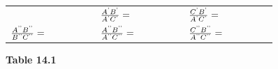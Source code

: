 {\begin{center}
\begin{xtabular*}{\mytablewidth}[t]{|p{10\mystarwidth}|p{10\mystarwidth}|p{10\mystarwidth}|}
               &
                \begin{math}\frac{{A}^{\text{'}}{B}^{\text{'}}}{{A}^{\text{'}}{C}^{\text{'}}}=\phantom{\rule{42.67912pt}{0ex}}\end{math}
               &
                \begin{math}\frac{{C}^{\text{'}}{B}^{\text{'}}}{{A}^{\text{'}}{C}^{\text{'}}}=\phantom{\rule{42.67912pt}{0ex}}\end{math}
     \tabularnewline{}
                \begin{math}\frac{{A}^{\text{'}\text{'}}{B}^{\text{'}\text{'}}}{{B}^{\text{'}\text{'}}{C}^{\text{'}\text{'}}}=\phantom{\rule{42.67912pt}{0ex}}\end{math}
               &
                \begin{math}\frac{{A}^{\text{'}\text{'}}{B}^{\text{'}\text{'}}}{{A}^{\text{'}\text{'}}{C}^{\text{'}\text{'}}}=\phantom{\rule{42.67912pt}{0ex}}\end{math}
               &
                \begin{math}\frac{{C}^{\text{'}\text{'}}{B}^{\text{'}\text{'}}}{{A}^{\text{'}\text{'}}{C}^{\text{'}\text{'}}}=\phantom{\rule{42.67912pt}{0ex}}\end{math}
     \tabularnewline{}
    \end{xtabular*}
      \end{center}
    \begin{center}{\small\bfseries Table 14.1}\end{center}
        }%
